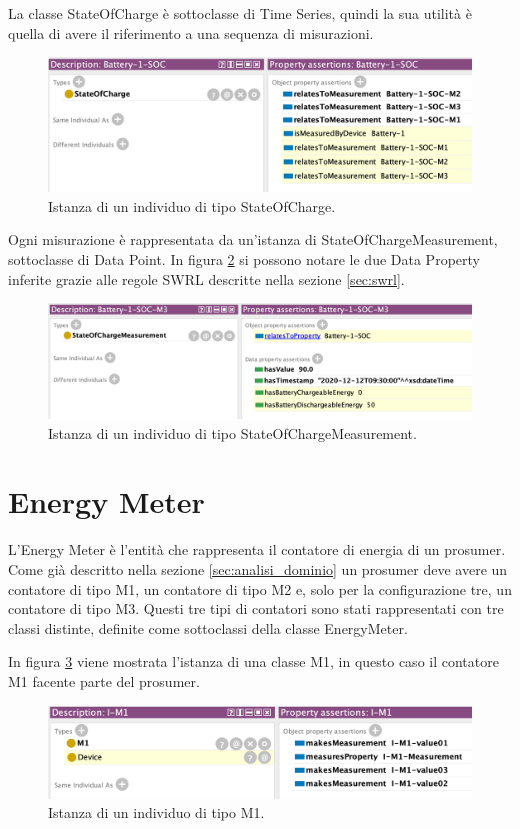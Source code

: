 La classe StateOfCharge è sottoclasse di Time Series, quindi la sua utilità è quella di avere il riferimento a una sequenza di misurazioni.
\begin{figure}[H]
    \centering
    \includegraphics[width=12cm]{images/individual-batterysoc.png}
    \caption{Istanza di un individuo di tipo StateOfCharge.}
    \label{fig:individual-batterysoc}
\end{figure}
Ogni misurazione è rappresentata da un'istanza di StateOfChargeMeasurement, sottoclasse di Data Point.
In figura \ref{fig:individual_batterym3} si possono notare le due Data Property inferite grazie alle regole SWRL descritte nella sezione \ref{sec:swrl}.
\begin{figure}[H]
    \centering
    \includegraphics[width=12cm]{images/individual-batterym3.png}
    \caption{Istanza di un individuo di tipo StateOfChargeMeasurement.}
    \label{fig:individual_batterym3}
\end{figure}

\section{Energy Meter}
L'Energy Meter è l'entità che rappresenta il contatore di energia di un prosumer. Come già descritto nella sezione \ref{sec:analisi_dominio} un prosumer deve avere un contatore di tipo M1, un contatore di tipo M2 e, solo per la configurazione tre, un contatore di tipo M3.
Questi tre tipi di contatori sono stati rappresentati con tre classi distinte, definite come sottoclassi della classe EnergyMeter.

In figura \ref{fig:individual_m1} viene mostrata l'istanza di una classe M1, in questo caso il contatore M1 facente parte del prosumer.
\begin{figure}[H]
    \centering
    \includegraphics[width=12cm]{images/individual_m1.png}
    \caption{Istanza di un individuo di tipo M1.}
    \label{fig:individual_m1}
\end{figure}

